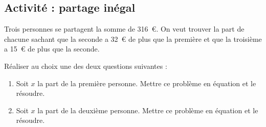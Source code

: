 
\subsection*{Activité : partage inégal}

Trois personnes se partagent la somme de \SI{316}{€}. On veut trouver la part de chacune sachant que la seconde a \SI{32}{€} de plus que la première et que la troisième a \SI{15}{€} de plus que la seconde.

Réaliser au choix une des deux questions suivantes :

\begin{enumerate}
    \item
 Soit $x$ la part de la première personne. Mettre ce problème en équation et le résoudre.
\item
Soit $x$ la part de la deuxième personne. Mettre ce problème en équation et le résoudre.
\end{enumerate}
